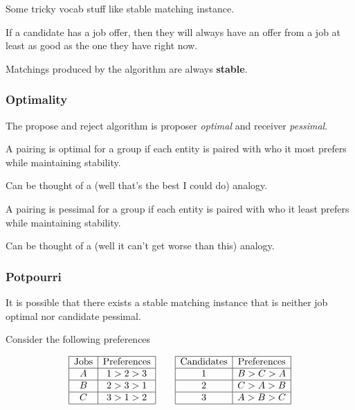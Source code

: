 Some tricky vocab stuff like stable matching instance. 

\begin{lemma}[Improvement]
    If a candidate has a job offer, then they will always have an offer from a job at least as good as the one they have right now. 
\end{lemma}

Matchings produced by the algorithm are always \textbf{stable}. 

\subsubsection{Optimality}

The propose and reject algorithm is proposer \textit{optimal} and receiver \textit{pessimal}.

\begin{definition}[optimal]
    A pairing is optimal for a group if each entity is paired with who it most prefers  while maintaining stability. 
\end{definition}

Can be thought of a (well that's the best I could do) analogy. 

\begin{definition}[pessimal]
    A pairing is pessimal for a group if each entity is paired with who it least prefers while maintaining stability.
\end{definition}

Can be thought of a (well it can't get worse than this) analogy. 

\subsubsection{Potpourri}
It is possible that there exists a stable matching instance that is neither job optimal nor candidate pessimal. 

Consider the following preferences

\[\begin{array}{|c|c|}
    \hline
    \text{Jobs} & \text{Preferences} \\
    \hline
    A & 1 > 2 > 3 \\
    \hline 
    B & 2 > 3 > 1\\
    \hline
    C & 3 > 1 > 2\\
    \hline
\end{array}
    \qquad 
    \begin{array}{|c|c|}
        \hline
        \text{Candidates} & \text{Preferences} \\
        \hline
        1 & B > C > A  \\
        \hline 
        2 & C > A > B \\
        \hline
        3 & A > B > C \\
        \hline
    \end{array}\]  

